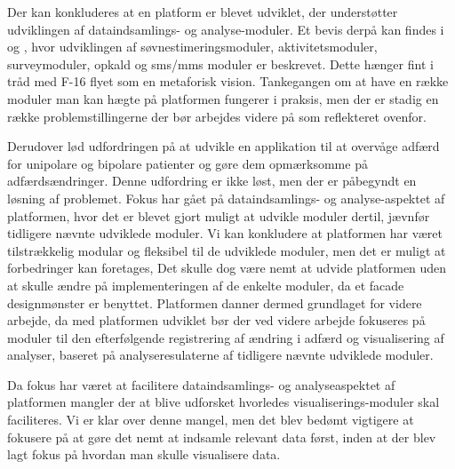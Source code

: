 Der kan konkluderes at en platform er blevet udviklet, der understøtter udviklingen af dataindsamlings- og analyse-moduler.
Et bevis derpå kan findes i \citet{misc:soevnrapp} og \citet{misc:surveyrapp}, hvor udviklingen af søvnestimeringsmoduler, aktivitetsmoduler, surveymoduler, opkald og sms/mms moduler er beskrevet.
Dette hænger fint i tråd med F-16 flyet som en metaforisk vision.
Tankegangen om at have en række moduler man kan hægte på platformen fungerer i praksis, men der er stadig en række problemstillingerne der bør arbejdes videre på som reflekteret ovenfor.

Derudover lød udfordringen på at udvikle en applikation til at overvåge adfærd for unipolare og bipolare patienter og gøre dem opmærksomme på adfærdsændringer.
Denne udfordring er ikke løst, men der er påbegyndt en løsning af problemet.
Fokus har gået på dataindsamlings- og analyse-aspektet af platformen, hvor det er blevet gjort muligt at udvikle moduler dertil, jævnfør tidligere nævnte udviklede moduler.
Vi kan konkludere at platformen har været tilstrækkelig modular og fleksibel til de udviklede moduler, men det er muligt at forbedringer kan foretages,
Det skulle dog være nemt at udvide platformen uden at skulle ændre på implementeringen af de enkelte moduler, da et facade designmønster er benyttet.
Platformen danner dermed grundlaget for videre arbejde, da med platformen udviklet bør der ved videre arbejde fokuseres på moduler til den efterfølgende registrering af ændring i adfærd og visualisering af analyser, baseret på analyseresulaterne af tidligere nævnte udviklede moduler.

Da fokus har været at facilitere dataindsamlings- og analyseaspektet af platformen mangler der at blive udforsket hvorledes visualiserings-moduler skal faciliteres.
Vi er klar over denne mangel, men det blev bedømt vigtigere at fokusere på at gøre det nemt at indsamle relevant data først, inden at der blev lagt fokus på hvordan man skulle visualisere data.



